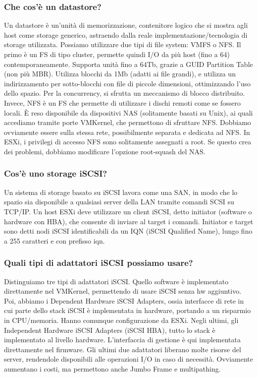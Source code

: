 \documentclass[11pt]{article}
\begin{document}
\subsubsection{Che cos'è un datastore?}
Un datastore è un'unità di memorizzazione, contenitore logico che si mostra agli host come storage generico, astraendo dalla reale implementazione/tecnologia di storage utilizzata. Possiamo utilizzare due tipi di file system: VMFS o NFS. Il primo è un FS di tipo cluster, permette quindi I/O da più host (fino a 64) contemporaneamente. Supporta unità fino a 64Tb, grazie a GUID Partition Table (non più MBR). Utilizza blocchi da 1Mb (adatti ai file grandi), e utilizza un indirizzamento per sotto-blocchi con file di piccole dimensioni, ottimizzando l'uso dello spazio. Per la concurrency, si sfrutta un meccanismo di blocco distribuito. Invece, NFS è un FS che permette di utilizzare i dischi remoti come se fossero locali. È reso disponibile da dispositivi NAS (solitamente basati su Unix), ai quali accediamo tramite porte VMKernel, che permettono di sfruttare NFS. Dobbiamo ovviamente essere sulla stessa rete, possibilmente separata e dedicata ad NFS. In ESXi, i privilegi di accesso NFS sono solitamente assegnati a root. Se questo crea dei problemi, dobbiamo modificare l'opzione root-squash del NAS. 

\subsubsection{Cos'è uno storage iSCSI?}
Un sistema di storage basato su iSCSI lavora come una SAN, in modo che lo spazio sia disponibile a qualsiasi server della LAN tramite comandi SCSI su TCP/IP. Un host ESXi deve utilizzare un client iSCSI, detto initiator (software o hardware con HBA), che consente di inviare al target i comandi. Initiator e target sono detti nodi iSCSI identificabili da un IQN (iSCSI Qualified Name), lungo fino a 255 caratteri e con prefisso iqn. 

\subsubsection{Quali tipi di adattatori iSCSI possiamo usare?}
Distinguiamo tre tipi di adattatori iSCSI. Quello software è implementato direttamente nel VMKernel, permettendo di usare iSCSI senza hw aggiuntivo. Poi, abbiamo i Dependent Hardware iSCSI Adapters, ossia interfacce di rete in cui parte dello stack iSCSI è implementata in hardware, portando a un risparmio in CPU/memoria. Hanno comunque configurazione da ESXi. Negli ultimi, gli Independent Hardware iSCSI Adapters (iSCSI HBA), tutto lo stack è implementato al livello hardware. L'interfaccia di gestione è qui implementata direttamente nel firmware. Gli ultimi due adattatori liberano molte risorse del server, rendendole disponibili alle operazioni I/O in caso di necessità. Ovviamente aumentano i costi, ma permettono anche Jumbo Frame e multipathing. 
\end{document}
